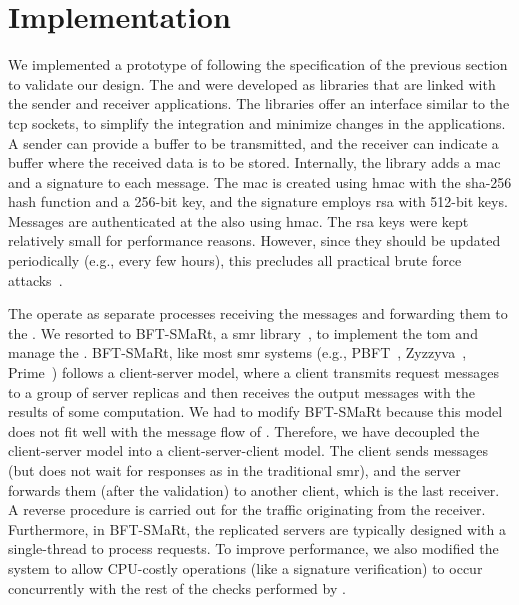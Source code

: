\section{Implementation}
\label{implementation}


We implemented a prototype of \sieveq following the specification of the previous section to validate our design.
The \sender and \postsieve were developed as libraries that are linked with the sender and receiver applications. 
The libraries offer an interface similar to the \gls{tcp} sockets, to simplify the integration and minimize changes in the applications. 
A sender can provide a buffer to be transmitted, and the receiver can indicate a buffer where the received data is to be stored.
Internally, the \sender library adds a \gls{mac} and a signature to each message. 
The \gls{mac} is created using \gls{hmac} with the \gls{sha}-256 hash function and a 256-bit key, and the signature employs \gls{rsa} with 512-bit keys. 
Messages are authenticated at the \postsieve also using \gls{hmac}. 
The \gls{rsa} keys were kept relatively small for performance reasons. 
However, since they should be updated periodically (e.g., every few hours), this precludes all practical brute force attacks~\cite{David:2015}.%

The \presieves operate as separate processes receiving the messages and forwarding them to the \repsieves.
We resorted to BFT-SMaRt, a \gls{smr} library~\cite{Bessani:2014}, to implement the \gls{tom} and manage the \repsieves.
BFT-SMaRt, like most \gls{smr} systems (e.g., PBFT~\cite{Castro:2002}, Zyzzyva~\cite{Kotla:2010}, Prime~\cite{Amir:2011}) follows a client-server model, where a client transmits request messages to a group of server replicas and then receives the output messages with the results of some computation.
We had to modify BFT-SMaRt because this model does not fit well with the message flow of \sieveq.
Therefore, we have decoupled the client-server model into a client-server-client model.
The client sends messages (but does not wait for responses as in the traditional \gls{smr}), and the server forwards them (after the validation) to another client, which is the last receiver.
A reverse procedure is carried out for the traffic originating from the receiver.
Furthermore, in BFT-SMaRt, the replicated servers are typically designed with a single-thread to process requests.
To improve performance, we also modified the system to allow CPU-costly operations (like a signature verification) to occur concurrently with the rest of the checks performed by \repsieves.

